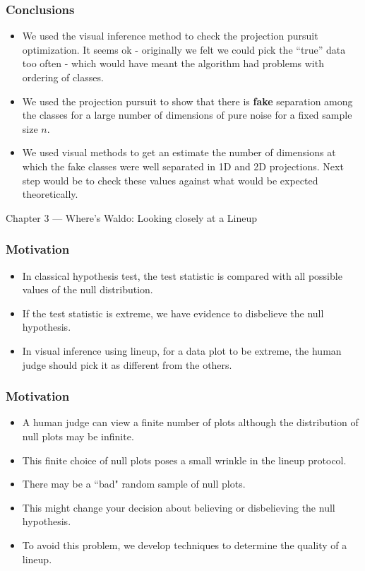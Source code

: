 \documentclass{beamer}
\begin{document}
\begin{frame}
\frametitle{Conclusions}
\begin{itemize}
\item We used the visual inference method to check the projection pursuit optimization. It seems ok - originally we felt we could pick the ``true'' data too often - which would have meant the algorithm had problems with ordering of classes.
\item We used the projection pursuit to show that there is {\bf fake} separation among the classes for a large number of dimensions of pure noise for a fixed sample size $n$.
\item We used visual methods to get an estimate the number of dimensions at which the fake classes were well separated in 1D and 2D projections. Next step would be to check these values against what would be expected theoretically.
\end{itemize}
\end{frame}

\begin{frame}
\begin{block}{}
\begin{center} \Large{Chapter 3 --- Where's Waldo: Looking closely at a Lineup} \end{center}
\end{block}
\end{frame}

\begin{frame}
\frametitle{Motivation}
\begin{itemize}
\item In classical hypothesis test, the test statistic is compared with all possible values of the null distribution.
\item If the test statistic is extreme, we have evidence to disbelieve the null hypothesis.
\item In visual inference using lineup, for a data plot to be extreme, the human judge should pick it as different from the others.
\end{itemize}
\end{frame}

\begin{frame}
\frametitle{Motivation}
\begin{itemize}
\item A human judge can view a finite number of plots although the distribution of null plots may be infinite.
\item This finite choice of null plots poses a small wrinkle in the lineup protocol.
\item There may be a ``bad" random sample of null plots.
\item This might change your decision about believing or disbelieving the null hypothesis.
\item To avoid this problem, we develop techniques to determine the quality of a lineup.
\end{itemize}
\end{frame}
\end{document}
